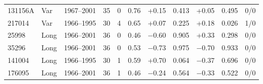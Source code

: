 \begin{tabular}{llrrrrrrrrr}
131156A & Var & 1967--2001 & 35 & 0 & 0.76 & +0.15 & 0.413 & +0.05 & 0.495 & 0/0 \\
217014 & Var & 1966--1995 & 30 & 4 & 0.65 & +0.07 & 0.225 & +0.18 & 0.026 & 1/0 \\
25998 & Long & 1966--2001 & 36 & 0 & 0.46 & $-$0.60 & 0.905 & +0.33 & 0.298 & 0/0 \\
35296 & Long & 1966--2001 & 36 & 0 & 0.53 & $-$0.73 & 0.975 & $-$0.70 & 0.933 & 0/0 \\
141004 & Long & 1966--1995 & 30 & 1 & 0.59 & +0.70 & 0.064 & $-$0.37 & 0.696 & 0/0 \\
176095 & Long & 1966--2001 & 36 & 1 & 0.46 & $-$0.24 & 0.564 & $-$0.33 & 0.522 & 0/0 \\
\hline
\end{tabular}
